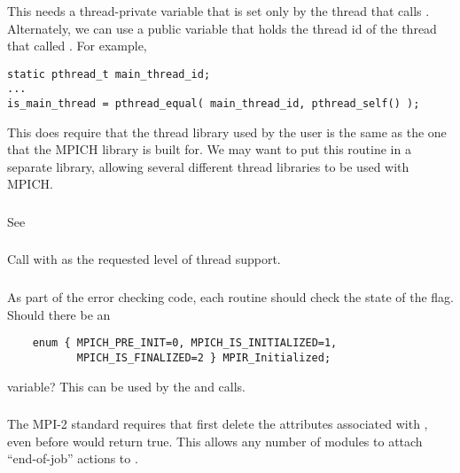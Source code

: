 \documentclass{article}
\begin{document}
\subsubsection{}
This needs a thread-private variable that is set only by the thread that calls
.  Alternately, we can use a public variable that
holds the thread id of the thread that called .  For
example, 
\begin{verbatim}
static pthread_t main_thread_id;
...
is_main_thread = pthread_equal( main_thread_id, pthread_self() );
\end{verbatim}
This does require that the thread library used by the user is the same as the
one that the MPICH library is built for.  We may want to put this routine in a
separate library, allowing several different thread libraries to be used with
MPICH. 

\subsubsection{}
See 

\subsubsection{}
Call  with  as the
requested level of thread support.

\subsubsection{}
As part of the error checking code, each routine should check the
state of the  flag.  Should there be an 
\begin{verbatim}
    enum { MPICH_PRE_INIT=0, MPICH_IS_INITIALIZED=1,
           MPICH_IS_FINALIZED=2 } MPIR_Initialized;
\end{verbatim}
variable?  This can be used by the  and
 calls.

\subsubsection{}
The MPI-2 standard requires that  first delete the
attributes associated with , even before
 would return true.  This allows any number of
modules to attach ``end-of-job'' actions to .
\end{document}
